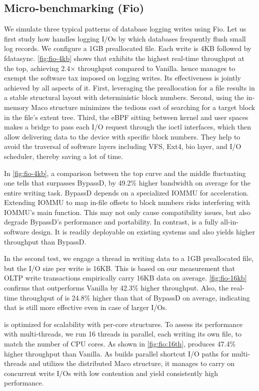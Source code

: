 \subsection{Micro-benchmarking (Fio)}\label{sec:eval:path}
We simulate three typical patterns of database logging writes using Fio.
Let us first study how \odes handles logging I/Os by which databases frequently flush  small log records.
 We configure a 1GB preallocated file. Each write is 4KB  followed by fdatasync. \autoref{fig:fio-4kb} shows that \odes exhibits the highest 
real-time throughput
  at the top,
  achieving  {2.4$\times$}  throughput
 compared to Vanilla.
 \odes hence manages to  exempt the software tax imposed on logging writes. Its  effectiveness
 is jointly achieved by all aspects of it. First,
leveraging the preallocation for a file results in a stable structural layout with deterministic block numbers.
 Second,
 using the in-memory Maco structure
  minimizes the tedious cost of searching for a target block in the file's extent tree.
 Third, the eBPF sitting between kernel and user spaces makes a bridge to pass
  each I/O request through the ioctl interfaces, which then allow delivering  data to the device with specific block numbers.
 They help to avoid the traversal of software layers including VFS, Ext4, bio layer, and I/O scheduler, thereby saving a lot of time.

In \autoref{fig:fio-4kb}, a comparison between the top curve and the middle fluctuating one tells that
\odes surpasses BypassD, by 49.2\% higher bandwidth on average for the entire writing task.
BypassD depends on a specialized  IOMMU for acceleration.
  Extending IOMMU to map in-file offsets to   block numbers risks interfering with IOMMU's main function.
  This may not only cause compatibility issues, but also degrade BypassD's performance and
  portability. In contrast, \odes is a fully all-in-software design. It is readily deployable on existing systems
  and also yields higher throughput than BypassD.

In the second   test, we   engage a   thread in writing data to a 1GB preallocated file, but the I/O size per write  is  16KB. This is based on our measurement that
OLTP write transactions
  empirically carry  16KB data on average. 
\autoref{fig:fio-16kb}  confirms that \odes outperforms Vanilla
by  {42.3\%} higher throughput.
Also, the real-time throughput of \odes is 24.8\% higher than that of BypassD on average, indicating that \odes is still more effective even
in case of larger   I/Os.

\odes is optimized for scalability with per-core structures.
To assess its performance with multi-threads, we run 16 threads in parallel, each writing its own file, to match the number of CPU cores. As shown in \autoref{fig:fio:16th}, \odes produces  {47.4\%} higher throughput than Vanilla. 
As \odes builds parallel shortcut I/O paths for multi-threads and utilizes the distributed Maco structure, it manages to carry on concurrent write I/Os with low contention and  yield consistently high performance.

